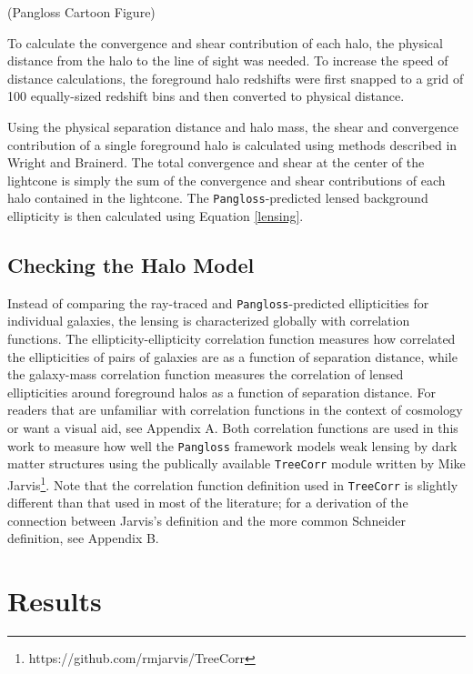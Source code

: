 \documentclass[%
 reprint,
 amsmath,amssymb,
 aps,
]{revtex4-1}
\begin{document}
(Pangloss Cartoon Figure)

To calculate the convergence and shear contribution of each halo, the physical distance from the halo to the line of sight was needed. To increase the speed of distance calculations, the foreground halo redshifts were first snapped to a grid of 100 equally-sized redshift bins and then converted to physical distance.

Using the physical separation distance and halo mass, the shear and convergence contribution of a single foreground halo is calculated using methods described in Wright and Brainerd\cite{lensing_calc}. The total convergence and shear at the center of the lightcone is simply the sum of the convergence and shear contributions of each halo contained in the lightcone. The \texttt{Pangloss}-predicted lensed background ellipticity is then calculated using Equation \eqref{lensing}.

\subsection*{Checking the Halo Model}

Instead of comparing the ray-traced and \texttt{Pangloss}-predicted ellipticities for individual galaxies, the lensing is characterized globally with correlation functions. The ellipticity-ellipticity correlation function measures how correlated the ellipticities of pairs of galaxies are as a function of separation distance, while the galaxy-mass correlation function measures the correlation of lensed ellipticities around foreground halos as a function of separation distance. For readers that are unfamiliar with correlation functions in the context of cosmology or want a visual aid, see Appendix A. Both correlation functions are used in this work to measure how well the \texttt{Pangloss} framework models weak lensing by dark matter structures using the publically available \texttt{TreeCorr} module written by Mike Jarvis\footnote{https://github.com/rmjarvis/TreeCorr}. Note that the correlation function definition used in \texttt{TreeCorr} is slightly different than that used in most of the literature; for a derivation of the connection between Jarvis's definition and the more common Schneider definition\cite{schneider}, see Appendix B.

\section{Results}
\end{document}
